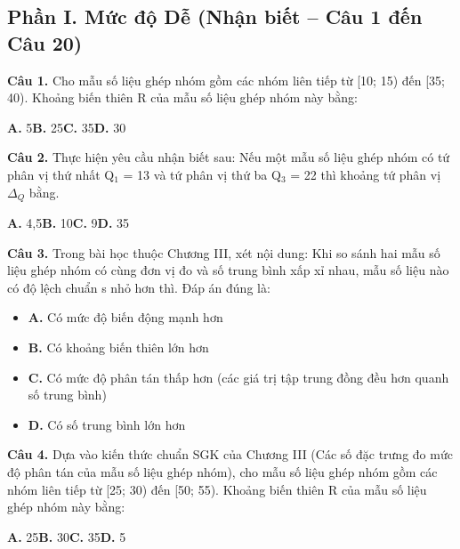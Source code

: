 \documentclass[11pt,a4paper]{article}
\begin{document}
\subsection*{\color{accent} Phần I. Mức độ Dễ (Nhận biết -- Câu 1 đến Câu 20)}
\textbf{\color{primary} Câu 1.} Cho mẫu số liệu ghép nhóm gồm các nhóm liên tiếp từ [10; 15) đến [35; 40). Khoảng biến thiên R của mẫu số liệu ghép nhóm này bằng:\par
\hspace*{1.5em}\textbf{A.} 5\quad\quad \textbf{B.} 25\quad\quad \textbf{C.} 35\quad\quad \textbf{D.} 30\par\vspace{2pt}
\textbf{\color{primary} Câu 2.} Thực hiện yêu cầu nhận biết sau: Nếu một mẫu số liệu ghép nhóm có tứ phân vị thứ nhất Q$_1$ = 13 và tứ phân vị thứ ba Q$_3$ = 22 thì khoảng tứ phân vị $\Delta_Q$ bằng.\par
\hspace*{1.5em}\textbf{A.} 4,5\quad\quad \textbf{B.} 10\quad\quad \textbf{C.} 9\quad\quad \textbf{D.} 35\par\vspace{2pt}
\textbf{\color{primary} Câu 3.} Trong bài học thuộc Chương III, xét nội dung: Khi so sánh hai mẫu số liệu ghép nhóm có cùng đơn vị đo và số trung bình xấp xỉ nhau, mẫu số liệu nào có độ lệch chuẩn s nhỏ hơn thì. Đáp án đúng là:\par
\begin{itemize}\setlength{\itemsep}{1pt}\setlength{\parskip}{0pt}
  \item[] \textbf{A.} Có mức độ biến động mạnh hơn
  \item[] \textbf{B.} Có khoảng biến thiên lớn hơn
  \item[] \textbf{C.} Có mức độ phân tán thấp hơn (các giá trị tập trung đồng đều hơn quanh số trung bình)
  \item[] \textbf{D.} Có số trung bình lớn hơn
\end{itemize}\vspace{2pt}
\textbf{\color{primary} Câu 4.} Dựa vào kiến thức chuẩn SGK của Chương III (Các số đặc trưng đo mức độ phân tán của mẫu số liệu ghép nhóm), cho mẫu số liệu ghép nhóm gồm các nhóm liên tiếp từ [25; 30) đến [50; 55). Khoảng biến thiên R của mẫu số liệu ghép nhóm này bằng:\par
\hspace*{1.5em}\textbf{A.} 25\quad\quad \textbf{B.} 30\quad\quad \textbf{C.} 35\quad\quad \textbf{D.} 5\par\vspace{2pt}
\end{document}
